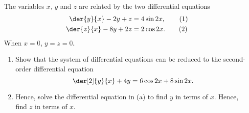 \begin{problem}
    The variables $x$, $y$ and $z$ are related by the two differential equations
    \begin{align*}
        \der{y}{x} - 2y + z &= 4 \sin {2x}, \tag{1}\\
        \der{z}{x} - 8y + 2z &= 2\cos{2x}. \tag{2}
    \end{align*}
    When $x = 0$, $y = z = 0$.

    \begin{enumerate}
        \item Show that the system of differential equations can be reduced to the second-order differential equation \[\der[2]{y}{x} + 4y = 6\cos{2x} + 8\sin{2x}.\]
        \item Hence, solve the differential equation in (a) to find $y$ in terms of $x$. Hence, find $z$ in terms of $x$.
    \end{enumerate}
\end{problem}
